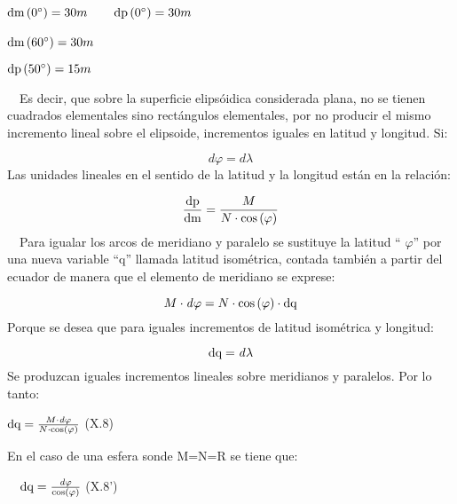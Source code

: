 \documentclass{tufte-book}
\newcommand\normalsubformula[1]{\text{\mathversion{normal}$#1$}}
\begin{document}
${\normalsubformula{\text{dm}}\left(0{}^{\circ}\right)=\text{30}m}$\ \ \ \ 
  ${\normalsubformula{\text{dp}}\left(0{}^{\circ}\right)=\text{30}m}$


${\normalsubformula{\text{dm}}\left(\text{60}{}^{\circ}\right)=\text{30}m}$\ \ \ \ 
 
${\normalsubformula{\text{dp}}\left(\text{50}{}^{\circ}\right)=\text{15}m}$

\ \ Es decir, que sobre la superficie elipsóidica considerada plana,
no se tienen cuadrados elementales sino rectángulos elementales, por
no producir el mismo incremento lineal sobre el elipsoide, incrementos
iguales en latitud y longitud. Si:

\begin{equation*}
{\mathit{d\varphi }=\mathit{d\lambda }}
\end{equation*}
Las unidades lineales en el sentido de la latitud y la longitud están
en la relación:

\begin{equation*}
{\frac{\normalsubformula{\text{dp}}}{\normalsubformula{\text{dm}}}=\frac{M}{N\cdot
\text{cos}\left(\varphi \right)}}
\end{equation*}
\ \ Para igualar los arcos de meridiano y paralelo se sustituye la
latitud {\textquotedblleft} ${\varphi }${\textquotedblright} por una
nueva variable {\textquotedblleft}q{\textquotedblright} llamada latitud
isométrica, contada también a partir del ecuador de manera que el
elemento de meridiano se exprese:

\begin{equation*}
{M\cdot \mathit{d\varphi }=N\cdot \text{cos}\left(\varphi \right)\cdot
\normalsubformula{\text{dq}}}
\end{equation*}
Porque se desea que para iguales incrementos de latitud isométrica y
longitud:

\begin{equation*}
{\normalsubformula{\text{dq}}=\mathit{d\lambda }}
\end{equation*}
Se produzcan iguales incrementos lineales sobre meridianos y paralelos.
Por lo tanto:

 ${\normalsubformula{\text{dq}}=\frac{M\cdot \mathit{d\varphi }}{N\cdot
\text{cos}\left(\varphi \right)}}$  (X.8)

En el caso de una esfera sonde M=N=R se tiene que:

\ \  ${\normalsubformula{\text{dq}}=\frac{\mathit{d\varphi
}}{\text{cos}\left(\varphi \right)}}$  (X.8{\textquoteright})
\end{document}
